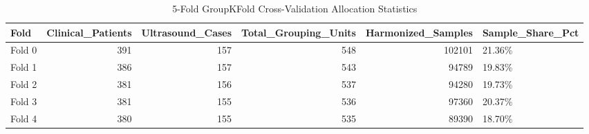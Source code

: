\begin{table}
\caption{5-Fold GroupKFold Cross-Validation Allocation Statistics}
\label{tab:table_fold_statistics}
\begin{tabular}{lrrrrl}
\toprule
Fold & Clinical\_Patients & Ultrasound\_Cases & Total\_Grouping\_Units & Harmonized\_Samples & Sample\_Share\_Pct \\
\midrule
Fold 0 & 391 & 157 & 548 & 102101 & 21.36\% \\
Fold 1 & 386 & 157 & 543 & 94789 & 19.83\% \\
Fold 2 & 381 & 156 & 537 & 94280 & 19.73\% \\
Fold 3 & 381 & 155 & 536 & 97360 & 20.37\% \\
Fold 4 & 380 & 155 & 535 & 89390 & 18.70\% \\
\bottomrule
\end{tabular}
\end{table}
